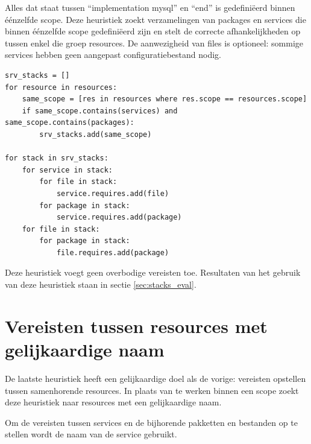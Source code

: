 Alles dat staat tussen ``implementation mysql'' en ``end'' is gedefini\"eerd binnen \'e\'enzelfde scope.
Deze heuristiek zoekt verzamelingen van packages en services die binnen \'e\'enzelfde scope gedefini\"eerd zijn en stelt de correcte afhankelijkheden op tussen enkel die groep resources.
De aanwezigheid van files is optioneel: sommige services hebben geen aangepast configuratiebestand nodig.

\begin{minipage}{\textwidth}
\begin{lstlisting}
srv_stacks = []
for resource in resources:
    same_scope = [res in resources where res.scope == resources.scope]
    if same_scope.contains(services) and same_scope.contains(packages):
        srv_stacks.add(same_scope)

for stack in srv_stacks:
    for service in stack:
        for file in stack:
            service.requires.add(file)
        for package in stack:
            service.requires.add(package)
    for file in stack:
        for package in stack:
            file.requires.add(package)
\end{lstlisting}
\end{minipage}

Deze heuristiek voegt geen overbodige vereisten toe.
Resultaten van het gebruik van deze heuristiek staan in sectie \ref{sec:stacks_eval}.

\section{Vereisten tussen resources met gelijkaardige naam}
\label{sec:namen}
De laatste heuristiek heeft een gelijkaardige doel als de vorige: vereisten opstellen tussen samenhorende resources.
In plaats van te werken binnen een scope zoekt deze heuristiek naar resources met een gelijkaardige naam.

Om de vereisten tussen services en de bijhorende pakketten en bestanden op te stellen wordt de naam van de service gebruikt.

